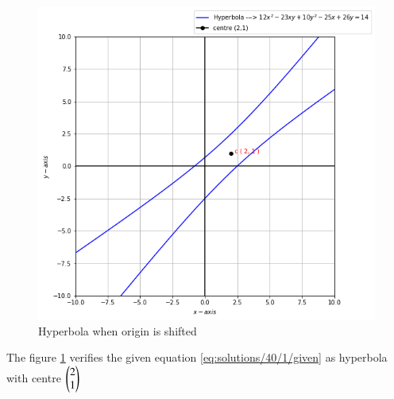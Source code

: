 \begin{figure}[h]
    \centering
    \includegraphics[width=\columnwidth]{./solutions/40/1/Assignment 8.png}
    \caption{Hyperbola when origin is shifted}
    \label{eq:solutions/40/1/Fig :1}
\end{figure}

The figure \ref{eq:solutions/40/1/Fig :1} verifies the given equation \eqref{eq:solutions/40/1/given} as hyperbola with centre $\begin{pmatrix}2\\1\end{pmatrix}$


